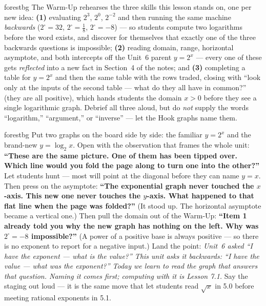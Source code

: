 \documentclass[10pt]{article}
\begin{document}
\begin{fixedskillbox}{forestbg}
    The Warm-Up rehearses the three skills this lesson stands on, one per new idea: \textbf{(1)}
    evaluating $2^3$, $2^0$, $2^{-2}$ and then running the same machine \emph{backwards}
    ($2^{\square}=32$, $2^{\square}=\frac18$, $2^{\square}=-8$) --- so students compute two logarithms
    before the word exists, and discover for themselves that exactly one of the three backwards
    questions is impossible; \textbf{(2)} reading domain, range, horizontal asymptote, and both
    intercepts off the Unit~6 parent $y=2^x$ --- every one of these gets \emph{reflected} into a new
    fact in Section~4 of the notes; and \textbf{(3)} completing a table for $y=2^x$ and then the same
    table with the rows traded, closing with ``look only at the inputs of the second table --- what do
    they all have in common?'' (they are all positive), which hands students the domain $x>0$ before
    they see a single logarithmic graph. Debrief all three aloud, but do \emph{not} supply the words
    ``logarithm,'' ``argument,'' or ``inverse'' --- let the Hook graphs name them.
\end{fixedskillbox}

\begin{skillbox}[Hook]{forestbg}
    Put two graphs on the board side by side: the familiar $y=2^x$ and the brand-new $y=\log_2 x$.
    Open with the observation that frames the whole unit: \textbf{``These are the same picture. One of
    them has been tipped over. Which line would you fold the page along to turn one into the
    other?''} Let students hunt --- most will point at the diagonal before they can name $y=x$. Then
    press on the asymptote: \textbf{``The exponential graph never touched the $x$-axis. This new one
    never touches the $y$-axis. What happened to that flat line when the page was folded?''} (It stood
    up. The horizontal asymptote became a vertical one.) Then pull the domain out of the Warm-Up:
    \textbf{``Item 1 already told you why the new graph has nothing on the left. Why was
    $2^{\square}=-8$ impossible?''} (A power of a positive base is always positive --- so there is no
    exponent to report for a negative input.) Land the point: \emph{Unit~6 asked ``I have the exponent
    --- what is the value?'' This unit asks it backwards: ``I have the value --- what was the
    exponent?'' Today we learn to read the graph that answers that question. Naming it comes first;
    computing with it is Lesson 7.1.} Say the staging out loud --- it is the same move that let
    students read $\sqrt{x}$ in 5.0 before meeting rational exponents in 5.1.
\end{skillbox}
\end{document}
